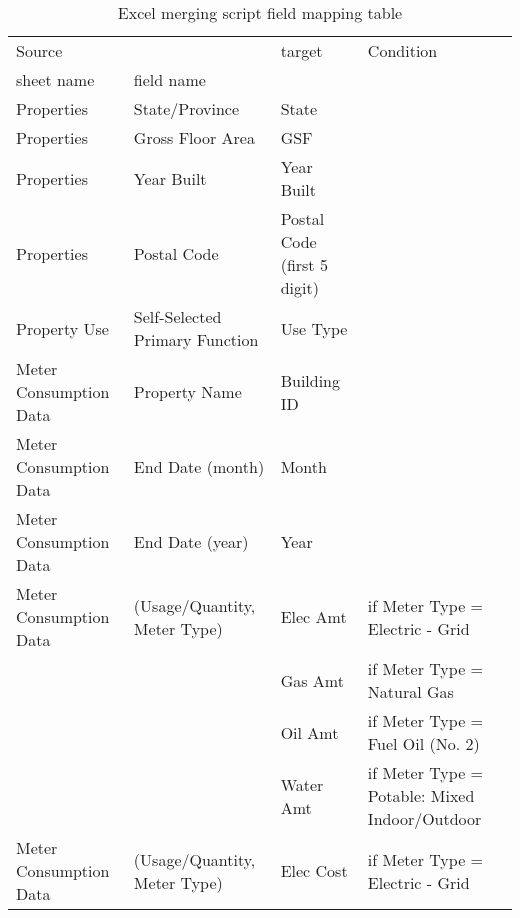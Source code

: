 \documentclass[12pt]{article}
\begin{document}
\begin{table}[h!]
  \scriptsize
\centering
\caption{Excel merging script field mapping table}
\label{tab:mapField}
\begin{tabular}{p{3cm}p{3cm}|p{3cm}|p{5cm}}
Source                 &                              & target                      & Condition                   \\
sheet name             & field name                   &                             &                             \\
  \hline
  \hline
Properties             & State/Province               & State                       &                             \\
  \hline
Properties             & Gross Floor Area             & GSF                         &                             \\
  \hline
Properties             & Year Built                   & Year Built                  &                             \\
  \hline
Properties             & Postal Code                  & Postal Code (first 5 digit) &                           \\ 
  \hline
Property Use & Self-Selected Primary Function         & Use Type                    \\ 
  \hline
  \hline
Meter Consumption Data & Property Name                & Building ID                 &                             \\
  \hline
Meter Consumption Data & End Date (month)             & Month                       &                             \\
  \hline
Meter Consumption Data & End Date (year)             & Year                        &                             \\
  \hline
Meter Consumption Data & (Usage/Quantity, Meter Type) & Elec Amt                    & if Meter Type = Electric - Grid\\
  \cline{3-4}
                       &                              & Gas Amt                     & if Meter Type = Natural Gas\\
  \cline{3-4}
                       &                              & Oil Amt                     & if Meter Type = Fuel Oil (No. 2)\\
  \cline{3-4}
                       &                              & Water Amt                   & if Meter Type = Potable: Mixed Indoor/Outdoor\\
  \hline
Meter Consumption Data & (Usage/Quantity, Meter Type) & Elec Cost                    & if Meter Type = Electric - Grid\\

\end{tabular}
\end{table}
\end{document}
